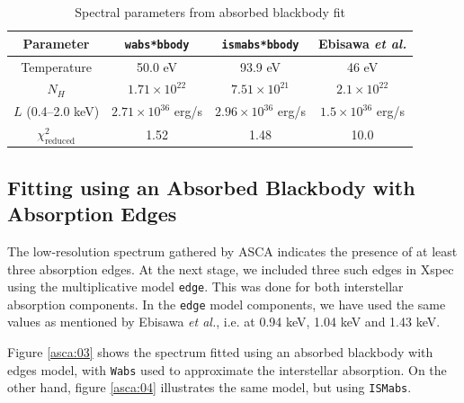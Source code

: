				\begin{table}[h!]
					\begin{center}
						\caption{Spectral parameters from absorbed blackbody fit}
						\label{tab-asca:01}
						\begin{tabulary}{\textwidth}{CCC|C}
							\hline
							{Parameter} & {\texttt{wabs*bbody}} & {\texttt{ismabs*bbody}} & {Ebisawa \emph{et al.}} \\
							\hline
							{Temperature} & {50.0 eV} & {93.9 eV} & {46 eV} \\
							{$N_H$} & {$1.71\times 10^{22}$} & {$7.51\times 10^{21}$} & {$2.1\times 10^{22}$} \\
							{$L$ (0.4--2.0 keV)} & {$2.71\times 10^{36}$ erg/s} & {$2.96\times 10^{36}$ erg/s} & {$1.5\times 10^{36}$ erg/s} \\
							{$\chi_{\mathrm{reduced}}^2$} & {1.52} & {1.48} & {10.0} \\
							\hline
						\end{tabulary}	
					\end{center}
				\end{table}

			\subsection{Fitting using an Absorbed Blackbody with Absorption Edges} \label{continuum:asca:abs-bb-edge}
				The low-resolution spectrum gathered by ASCA indicates the presence of at least three absorption edges. At the next stage, we included three such edges in Xspec using the multiplicative model \texttt{edge}. This was done for both interstellar absorption components. In the \texttt{edge} model components, we have used the same values as mentioned by Ebisawa \emph{et al.}, i.e. at 0.94 keV, 1.04 keV and 1.43 keV.
				
				Figure \ref{asca:03} shows the spectrum fitted using an absorbed blackbody with edges model, with \texttt{Wabs} used to approximate the interstellar absorption. On the other hand, figure \ref{asca:04} illustrates the same model, but using \texttt{ISMabs}.
				
